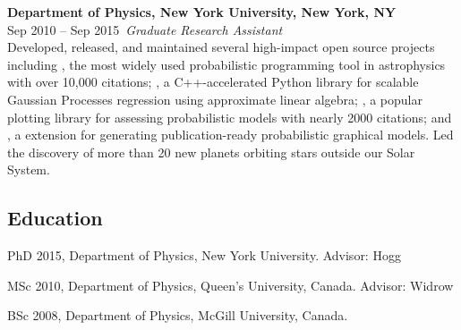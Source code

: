\documentclass[11pt,letterpaper]{article}
\begin{document}
\begin{list}{}{\cvlist}
    \item
        \textbf{Department of Physics, New York University, New York, NY} \\
        {\color{numcolor} Sep 2010 -- Sep 2015}\,
        \emph{Graduate Research Assistant} \\
        Developed, released, and maintained several high-impact open source projects including
        \href{https://github.com/dfm/emcee}{}, the most widely used probabilistic programming tool in astrophysics with over 10,000 citations;
        \href{https://github.com/dfm/george}{}, a C++-accelerated Python library for scalable Gaussian Processes regression using approximate linear algebra;
        \href{https://github.com/dfm/corner.py}{}, a popular plotting library for assessing probabilistic models with nearly 2000 citations;
        and
        \href{https://github.com/daft-dev/daft}{}, a  extension for generating publication-ready probabilistic graphical models.
        Led the discovery of more than 20 new planets orbiting stars outside our Solar System.
\end{list}

\subsection{Education}
\begin{list}{}{\cvlist}
  \item
        PhD 2015, Department of Physics, New York University. Advisor: Hogg
  \item
        MSc 2010, Department of Physics, Queen's University, Canada. Advisor: Widrow
  \item
        BSc 2008, Department of Physics, McGill University, Canada.
\end{list}
\end{document}
